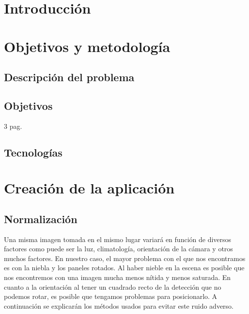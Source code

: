 \documentclass[a4paper, 12pt]{article}
\begin{document}
\section{Introducción}
\section{Objetivos y metodología}

\subsection{Descripción del problema}

\subsection{Objetivos}
3 pag.
\subsection{Tecnologías}


\section{Creación de la aplicación}
\subsection{Normalización}
Una misma imagen tomada en el mismo lugar variará en función de diversos factores como puede ser la luz, climatología, orientación de la cámara y otros muchos factores. En nuestro caso, el mayor problema con el que nos encontramos es con la niebla y los paneles rotados. Al haber nieble en la escena es posible que nos encontremos con una imagen mucha menos nítida y menos saturada. En cuanto a la orientación al tener un cuadrado recto de la detección que no podemos rotar, es posible que tengamos problemas para posicionarlo. A continuación se explicarán los métodos usados para evitar este ruido adverso.
\end{document}
